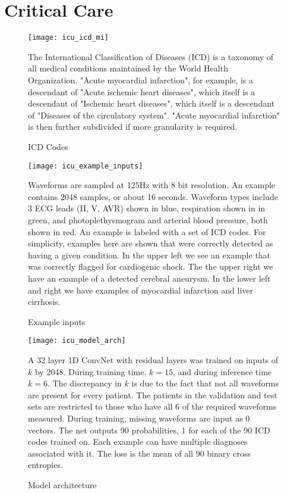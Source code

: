 \chapter{Critical Care}

\begin{figure}
\texttt{[image: icu\_icd\_mi]}
\caption{ICD Codes}
\vspace{12px}
The International Classification of Diseases (ICD) is a taxonomy of all medical conditions maintained by the World Health Organization.  "Acute myocardial infarction", for example, is a descendant of "Acute ischemic heart diseases", which itself is a descendant of "Ischemic heart diseases", which itself is a descendant of "Diseases of the circulatory system".  "Acute myocardial infarction" is then further subdivided if more granularity is required.
\label{fig:icu_icd_mi}
\end{figure}

\begin{figure}
\texttt{[image: icu\_example\_inputs]}
\caption{Example inputs}
\vspace{12px}
Waveforms are sampled at 125Hz with 8 bit resolution.  An example contains 2048 samples, or about 16 seconds.  Waveform types include 3 ECG leads (II, V, AVR) shown in blue, respiration shown in in green, and photoplethysmogram and arterial blood pressure, both shown in red.  An example is labeled with a set of ICD codes.  For simplicity, examples here are shown that were correctly detected as having a given condition.  In the upper left we see an example that was correctly flagged for cardiogenic shock.  The the upper right we have an example of a detected cerebral aneurysm.  In the lower left and right we have examples of myocardial infarction and liver cirrhosis.
\label{fig:icu_example_waveforms}
\end{figure}

\begin{figure}
\texttt{[image: icu\_model\_arch]}
\caption{Model architecture}
\vspace{12px}
A 32 layer 1D ConvNet with residual layers was trained on inputs of $k$ by 2048.  During training time, $k = 15$, and during inference time $k = 6$.  The discrepancy in $k$ is due to the fact that not all waveforms are present for every patient.  The patients in the validation and test sets are restricted to those who have all 6 of the required waveforms measured.  During training, missing waveforms are input as 0 vectors.  The net outputs 90 probabilities, 1 for each of the 90 ICD codes trained on.  Each example can have multiple diagnoses associated with it.  The loss is the mean of all 90 binary cross entropies.
\label{fig:icu_model_arch}
\end{figure}

